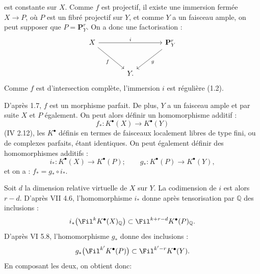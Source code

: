 
est constante sur $X$. Comme $f$ est projectif, il existe une immersion fermée $X\to P$, où $P$ est un fibré projectif sur $Y$, et comme $Y$ a un faisceau ample, on peut supposer que $P=\mathbf{P}^r_Y$. On a donc une factorisation :
\[
\begin{tikzcd}[column sep=large,row sep=large]
X \arrow[rr,"i"] \arrow[dr,"f"'] && \mathbf{P}^r_Y \arrow[dl,"g"]\\
& Y. &
\end{tikzcd}
\]
Comme $f$ est d'intersection complète, l'immersion $i$ est régulière (1.2).

D'après 1.7, $f$ est un morphisme parfait. De plus, $Y$ a un faisceau ample et par suite $X$ et $P$ également. On peut alors définir un homomorphisme additif :
\[
f_*:K^{\bullet}(X)\longrightarrow K^{\bullet}(Y)
\]
(IV 2.12), les $K^{\bullet}$ définis en termes de faisceaux localement libres de type fini, ou de complexes parfaits, étant identiques. On peut également définir des homomorphismes additifs :
\[
i_*:K^{\bullet}(X)\longrightarrow K^{\bullet}(P);
\qquad
 g_*:K^{\bullet}(P)\longrightarrow K^{\bullet}(Y),
\]
et on a : $f_*=g_*\circ i_*$.

Soit $d$ la dimension relative virtuelle de $X$ sur $Y$. La codimension de $i$ est alors $r-d$. D'après VII 4.6, l'homomorphisme $i_*$ donne après tensorisation par $\mathbb Q$ des inclusions :
\[
i_*\bigl(\Fil^kK^{\bullet}(X)_{\mathbb Q}\bigr)
\subset
\Fil^{k+r-d}K^{\bullet}(P)_{\mathbb Q}.
\]
D'après VI 5.8, l'homomorphisme $g_*$ donne des inclusions :
\[
g_*\bigl(\Fil^{k'}K^{\bullet}(P)\bigr)
\subset
\Fil^{k'-r}K^{\bullet}(Y).
\]
En composant les deux, on obtient donc:

